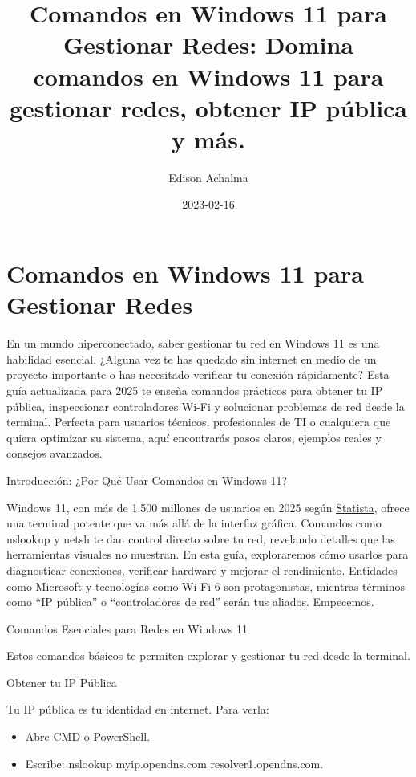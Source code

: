 \documentclass[
  doc,
  floatsintext,
  longtable,
  a4paper,
  nolmodern,
  notxfonts,
  notimes,
  colorlinks=true,linkcolor=blue,citecolor=blue,urlcolor=blue]{apa7}
\title{Comandos en Windows 11 para Gestionar Redes: Domina comandos en
Windows 11 para gestionar redes, obtener IP pública y más.}
\author{Edison Achalma}
\affiliation{
{Escuela Profesional de Economía, Universidad Nacional de San Cristóbal
de Huamanga}}
\date{2023-02-16}
\providecommand{\tightlist}{%
  \setlength{\itemsep}{0pt}\setlength{\parskip}{0pt}}
\begin{document}
\maketitle

\hypertarget{toc}{}
\tableofcontents
\newpage
\section[Introduction]{Comandos en Windows 11 para Gestionar Redes}

\setcounter{secnumdepth}{5}

\setlength\LTleft{0pt}


En un mundo hiperconectado, saber gestionar tu red en Windows 11 es una
habilidad esencial. ¿Alguna vez te has quedado sin internet en medio de
un proyecto importante o has necesitado verificar tu conexión
rápidamente? Esta guía actualizada para 2025 te enseña comandos
prácticos para obtener tu IP pública, inspeccionar controladores Wi-Fi y
solucionar problemas de red desde la terminal. Perfecta para usuarios
técnicos, profesionales de TI o cualquiera que quiera optimizar su
sistema, aquí encontrarás pasos claros, ejemplos reales y consejos
avanzados.

Introducción: ¿Por Qué Usar Comandos en Windows 11?

Windows 11, con más de 1.500 millones de usuarios en 2025 según
\href{https://www.statista.com/}{Statista}, ofrece una terminal potente
que va más allá de la interfaz gráfica. Comandos como nslookup y netsh
te dan control directo sobre tu red, revelando detalles que las
herramientas visuales no muestran. En esta guía, exploraremos cómo
usarlos para diagnosticar conexiones, verificar hardware y mejorar el
rendimiento. Entidades como Microsoft y tecnologías como Wi-Fi 6 son
protagonistas, mientras términos como ``IP pública'' o ``controladores
de red'' serán tus aliados. Empecemos.

Comandos Esenciales para Redes en Windows 11

Estos comandos básicos te permiten explorar y gestionar tu red desde la
terminal.

Obtener tu IP Pública

Tu IP pública es tu identidad en internet. Para verla:

\begin{itemize}
\tightlist
\item
  Abre CMD o PowerShell.
\item
  Escribe: nslookup myip.opendns.com resolver1.opendns.com.
\end{itemize}
\end{document}
